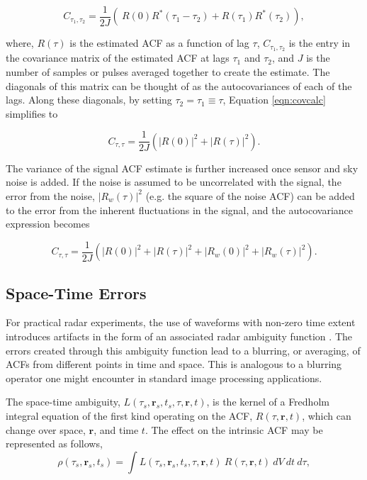 \documentclass[draft,ras]{agutex}
\begin{document}
\begin{article}
\begin{equation}
\label{eqn:covcalc}
C_{\tau_1,\tau_2} = \frac{1}{2J} \left( \ R(0)  R^*(\tau_1-\tau_2) +  R(\tau_1) R^*(\tau_2) \right),
\end{equation}

\noindent where, $R(\tau)$ is the estimated ACF as a function of lag $\tau$, $C_{\tau_1,\tau_2}$ is the entry in the covariance matrix of the estimated ACF at lags $\tau_1$ and $\tau_2$,  and $J$ is the number of samples or pulses averaged together to create the estimate. The diagonals of this matrix can be thought of as the autocovariances of each of the lags.  Along these diagonals, by setting $\tau_2 = \tau_1 \equiv \tau$, Equation \ref{eqn:covcalc} simplifies to

\begin{equation}
\label{eqn:covdiag}
C_{\tau,\tau} = \frac{1}{2J} \left(  |R(0)|^2 +|R(\tau)|^2\right).
\end{equation}

The variance of the signal ACF estimate is further increased once sensor and sky noise is added.  If the noise is assumed to be uncorrelated with the signal, the error from the noise, $\left|R_w (\tau)\right|^2$ (e.g. the square of the noise ACF) can be added to the error from the inherent fluctuations in the signal, and the autocovariance expression becomes

\begin{equation}
\label{eqn:covdiagwn}
C_{\tau,\tau} = \frac{1}{2J} \left(  |R(0)|^2 +|R(\tau)|^2 + \left|R_w (0)\right|^2+\left|R_w (\tau)\right|^2\right).
\end{equation}

\subsection{Space-Time Errors}

For practical radar experiments, the use of waveforms with non-zero time extent introduces artifacts in the form of an associated radar ambiguity function \citep{nygren1996}.  The errors created through this ambiguity function lead to a blurring, or averaging, of ACFs from different points in time and space. This is analogous to a blurring operator one might encounter in standard image processing applications.
 
The space-time ambiguity, $L(\tau_s,\mathbf{r}_s,t_s,\tau,\mathbf{r},t)$, is the kernel of a Fredholm integral equation of the first kind operating on the ACF, $R(\tau,\mathbf{r},t)$, which can change over space, $\mathbf{r}$, and time $t$. The effect on the intrinsic ACF may be represented as follows,
 \begin{equation}
  \label{eqn:staf}
  \rho(\tau_s,\mathbf{r}_s,t_s) =\int L(\tau_s,\mathbf{r}_s,t_s,\tau,\mathbf{r},t)\:R(\tau,\mathbf{r},t)\ dV\ dt\ d\tau,
\end{equation}


\end{article}
\end{document}
